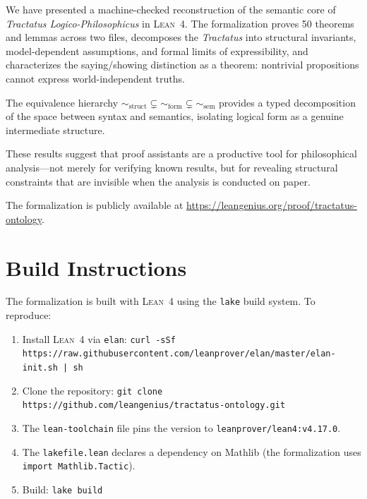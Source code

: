 \documentclass[10pt, letterpaper]{article}
\theoremstyle{definition}
\theoremstyle{remark}
\newcommand{\structEq}{\sim_{\mathrm{struct}}}
\newcommand{\formEq}{\sim_{\mathrm{form}}}
\newcommand{\semEq}{\sim_{\mathrm{sem}}}
\newcommand{\Lean}{\textsc{Lean}}
\begin{document}
We have presented a machine-checked reconstruction of the
semantic core of \emph{Tractatus Logico-Philosophicus} in
\Lean~4.  The formalization proves 50 theorems and lemmas across
two files, decomposes the
\emph{Tractatus} into structural invariants, model-dependent
assumptions, and formal limits of expressibility, and
characterizes the saying/showing distinction as a theorem:
nontrivial propositions cannot express world-independent truths.

The equivalence hierarchy $\structEq \subsetneq \formEq
\subsetneq \semEq$ provides a typed decomposition of the space
between syntax and semantics, isolating logical form as a
genuine intermediate structure.

These results suggest that proof assistants are a productive tool
for philosophical analysis---not merely for verifying known
results, but for revealing structural constraints that are
invisible when the analysis is conducted on paper.

The formalization is publicly available at
\url{https://leangenius.org/proof/tractatus-ontology}.


\appendix

\section{Build Instructions}
\label{app:build}

The formalization is built with \Lean~4 using the \texttt{lake}
build system.  To reproduce:

\begin{enumerate}[nosep]
  \item Install \Lean~4 via \texttt{elan}:
    \texttt{curl -sSf https://raw.githubusercontent.com/leanprover/elan/master/elan-init.sh | sh}
  \item Clone the repository:
    \texttt{git clone https://github.com/leangenius/tractatus-ontology.git}
  \item The \texttt{lean-toolchain} file pins the version to
    \texttt{leanprover/lean4:v4.17.0}.
  \item The \texttt{lakefile.lean} declares a dependency on Mathlib
    (the formalization uses \texttt{import Mathlib.Tactic}).
  \item Build: \texttt{lake build}
\end{enumerate}
\end{document}
